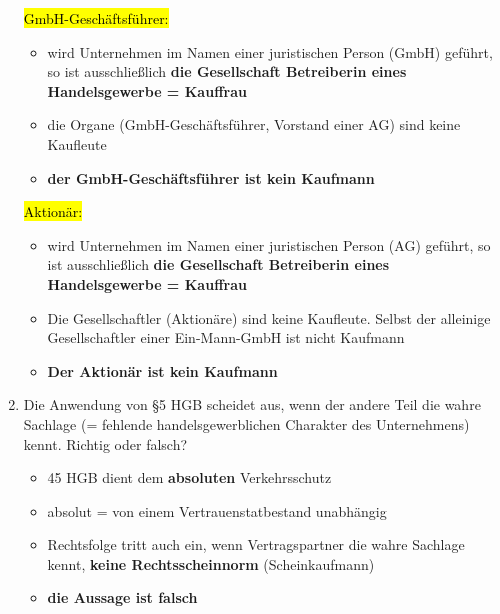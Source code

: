 \documentclass[a4paper, 10pt]{article}
\begin{document}
\begin{enumerate}
        \hl{GmbH-Geschäftsführer:}
        \begin{itemize}
            \item wird Unternehmen im Namen einer juristischen Person (GmbH) geführt, so ist ausschließlich \textbf{die Gesellschaft Betreiberin eines Handelsgewerbe = Kauffrau}
            \item die Organe (GmbH-Geschäftsführer, Vorstand einer AG) sind keine Kaufleute
            \item \textbf{der GmbH-Geschäftsführer ist kein Kaufmann}
        \end{itemize}

        \hl{Aktionär:}
        \begin{itemize}
            \item wird Unternehmen im Namen einer juristischen Person (AG) geführt, so ist ausschließlich \textbf{die Gesellschaft Betreiberin eines Handelsgewerbe = Kauffrau}
            \item Die Gesellschaftler (Aktionäre) sind keine Kaufleute. Selbst der alleinige Gesellschaftler einer Ein-Mann-GmbH ist nicht Kaufmann
            \item \textbf{Der Aktionär ist kein Kaufmann}
        \end{itemize}

        \item Die Anwendung von §5 HGB scheidet aus, wenn der andere Teil die wahre Sachlage (= fehlende handelsgewerblichen Charakter des Unternehmens) kennt. Richtig oder falsch?
        \begin{itemize}
            \item 45 HGB dient dem \textbf{absoluten} Verkehrsschutz
            \item absolut = von einem Vertrauenstatbestand unabhängig
            \item Rechtsfolge tritt auch ein, wenn Vertragspartner die wahre Sachlage kennt, \textbf{keine Rechtsscheinnorm} (Scheinkaufmann)
            \item \textbf{die Aussage ist falsch}
        \end{itemize}


\end{enumerate}
\end{document}
